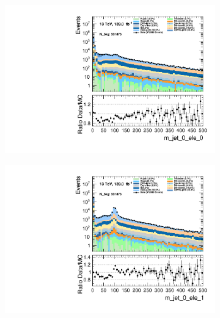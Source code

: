 \begin{figure}
\begin{subfigure}{.49\textwidth}
        \includegraphics[width=\textwidth]{Figures/MC_Data_comp/m_jet_0_ele_0.pdf}
        \caption{ }
        \label{fig:fep}
    \end{subfigure}
    \hfill
    \begin{subfigure}{.49\textwidth}
        \includegraphics[width=\textwidth]{Figures/MC_Data_comp/m_jet_0_ele_1.pdf}
        \caption{ }
        \label{fig:fe}
    \end{subfigure}
    \hfill       
    \caption{}
    \label{fig:t}
\end{figure}


